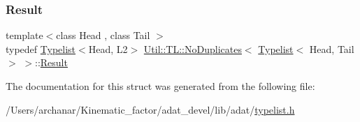 \mbox{\label{structUtil_1_1TL_1_1NoDuplicates_3_01Typelist_3_01Head_00_01Tail_01_4_01_4_ada564784f87c4684be2e13c5e1bf722e}} 
\subsubsection{\texorpdfstring{Result}{Result}\hspace{0.1cm}{\footnotesize\ttfamily [2/2]}}
{\footnotesize\ttfamily template$<$class Head , class Tail $>$ \\
typedef \mbox{\hyperlink{structUtil_1_1Typelist}{Typelist}}$<$Head, L2$>$ \mbox{\hyperlink{structUtil_1_1TL_1_1NoDuplicates}{Util\+::\+T\+L\+::\+No\+Duplicates}}$<$ \mbox{\hyperlink{structUtil_1_1Typelist}{Typelist}}$<$ Head, Tail $>$ $>$\+::\mbox{\hyperlink{structUtil_1_1TL_1_1NoDuplicates_3_01Typelist_3_01Head_00_01Tail_01_4_01_4_ada564784f87c4684be2e13c5e1bf722e}{Result}}}



The documentation for this struct was generated from the following file\+:\begin{DoxyCompactItemize}
\item 
/\+Users/archanar/\+Kinematic\+\_\+factor/adat\+\_\+devel/lib/adat/\mbox{\hyperlink{lib_2adat_2typelist_8h}{typelist.\+h}}\end{DoxyCompactItemize}
